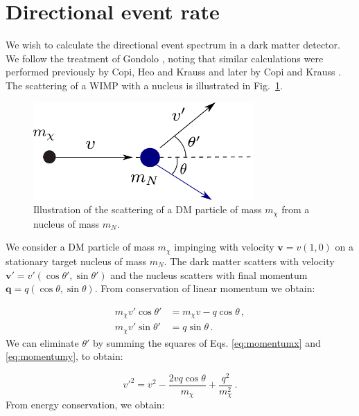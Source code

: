 \section{Directional event rate}

We wish to calculate the directional event spectrum in a dark matter detector. We follow the treatment of Gondolo \cite{Gondolo:2002}, noting that similar calculations were performed previously by Copi, Heo and Krauss \cite{Copi:1999} and later by Copi and Krauss \cite{Copi:2001}. The scattering of a WIMP with a nucleus is illustrated in Fig.~\ref{fig:directional:scattering}. 

\begin{figure}[h!]
  \centering
  \includegraphics[width=0.75\textwidth]{Directional/Scattering.pdf}
\caption[Illustration of DM-nucleus scattering]{Illustration of the scattering of a DM particle of mass $m_\chi$ from a nucleus of mass $m_N$.}
  \label{fig:directional:scattering}
\end{figure}

We consider a DM particle of mass \(m_\chi\) impinging with velocity \(\textbf{v} = v\left(1,0\right)\) on a stationary target nucleus of mass \(m_N\). The dark matter scatters with velocity \(\textbf{v}' = v'\left(\cos \theta',\sin \theta'\right)\) and the nucleus scatters with final momentum \(\textbf{q} = q\left(\cos \theta, \sin \theta\right)\). From conservation of linear momentum we obtain:

\begin{align}
m_\chi v' \cos \theta' &= m_\chi v - q\cos \theta \,, \label{eq:momentumx}\\
m_\chi v' \sin \theta' &= q \sin \theta \,. \label{eq:momentumy}
\end{align}
We can eliminate \(\theta'\) by summing the squares of Eqs. \ref{eq:momentumx} and \ref{eq:momentumy}, to obtain:

\begin{equation}
v'^2 = v^2 - \frac{2 v q \cos \theta}{m_\chi} + \frac{q^2}{m_\chi^2}\,.
\end{equation}
From energy conservation, we obtain:

